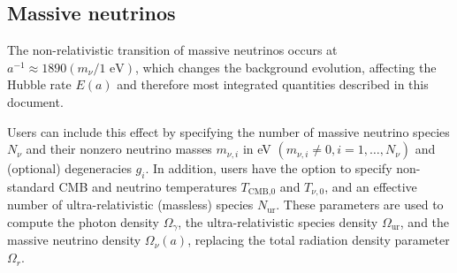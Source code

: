 
\subsection{Massive neutrinos}

The non-relativistic transition of massive neutrinos occurs at $a^{-1}\approx 1890 (m_\nu/1\text{ eV})$, which changes the background evolution, affecting the Hubble rate $E(a)$ and therefore most integrated quantities described in this document.


Users can include this effect by specifying the number of massive neutrino species $N_\nu$ and their nonzero neutrino masses $m_{\nu,i}$ in eV $(m_{\nu,i}\neq 0, i=1,\dots,N_\nu)$ and (optional) degeneracies $g_i$. In addition, users have the option to specify non-standard CMB and neutrino temperatures $T_\text{CMB,0}$ and $T_{\nu,0}$, and an effective number of ultra-relativistic (massless) species $N_\mathrm{ur}$. These parameters are used to compute the photon density $\Omega_\gamma$, the ultra-relativistic species density $\Omega_\mathrm{ur}$, and the massive neutrino density $\Omega_\nu(a)$, replacing the total radiation density parameter $\Omega_r$.

